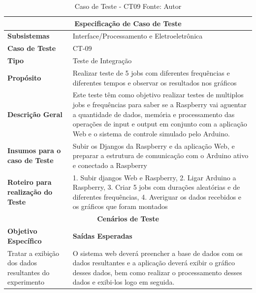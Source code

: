\begin{table}[H]
    \begin{center}
        \begin{tabular}{|p{5cm}|p{12cm}|}
            \hline
            \multicolumn{2}{|c|}{\textbf{Especificação de Caso de Teste}} \\ \hline
                \textbf{Subsistemas}                               &  Interface/Processamento e Eletroeletrônica \\ \hline
                \textbf{Caso de Teste}                             & CT-09 \\ \hline
                \textbf{Tipo}                                             & Teste de Integração \\ \hline
                \textbf{Propósito}                                     & Realizar teste de 5 jobs com diferentes frequências e diferentes tempos e observar os resultados nos gráficos \\ \hline
                \textbf{Descrição Geral}                           & Este teste têm como objetivo realizar testes de multiplos jobs e frequências para saber se a Raspberry vai aguentar a quantidade de dados, memória e processamento das operações de input  e output em conjunto com a aplicação Web e o sistema de controle simulado pelo Arduino. \\ \hline
                \textbf{Insumos para o caso de Teste}    & Subir os Djangos da Raspberry e da aplicação Web, e preparar a estrutura de comunicação com o Arduino ativo e conectado a Raspberry \\ \hline
                \textbf{Roteiro para realização do Teste}&  1. Subir djangos Web e Raspberry, 2. Ligar Arduino a Raspberry, 3. Criar 5 jobs com durações aleatórias e de diferentes frequências, 4. Averiguar os dados recebidos e os gráficos que foram montados  \\ \hline
            \multicolumn{2}{|c|}{\textbf{Cenários de Teste}} \\ \hline
                \textbf{Objetivo Específico}                      & \textbf{Saídas Esperadas} \\ \hline
                Tratar a exibição dos dados resultantes do experimento & O sistema web deverá preencher a base de dados com os dados resultantes e a aplicação deverá exibir o gráfico desses dados, bem como realizar o processamento desses dados e exibi-los logo em seguida. \\ \hline
        \end{tabular}
    \end{center}
    \caption[Caso de Teste - CT09]{Caso de Teste - CT09
    \protect Fonte: Autor}
    \label{CT-09}
\end{table}

